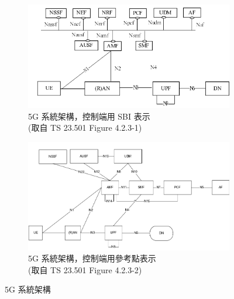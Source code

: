 \begin{figure}[ht]
  \centering
  \captionsetup{justification=centering}
  \begin{subfigure}[b]{.5\linewidth}
      \centering
      \includegraphics[height=!,width=0.95\linewidth,keepaspectratio=true]{figures/23_501_4-2-3-1_sys_arch_sbi}
      \caption[5G 系統架構，控制端用 SBI 表示]{{5G 系統架構，控制端用 SBI 表示\\\scriptsize (取自 TS 23.501 Figure 4.2.3-1)}}
      \label{fig:5g_system_architecture_sbi}
  \end{subfigure}%
  \begin{subfigure}[b]{.5\linewidth}
      \centering
      \includegraphics[height=!,width=0.95\linewidth,keepaspectratio=true]{figures/23_501_4-2-3-2_sys_arch_ref}
      \caption[5G 系統架構，控制端用參考點表示]{{5G 系統架構，控制端用參考點表示\\\scriptsize (取自 TS 23.501 Figure 4.2.3-2)}}
      \label{fig:5g_system_architecture_interface}
  \end{subfigure}
  \caption[5G 系統架構]{{\footnotesize 5G 系統架構~\cite{3gpp.23.501}}}
  \label{fig:5g_system_architecture}
\end{figure}

